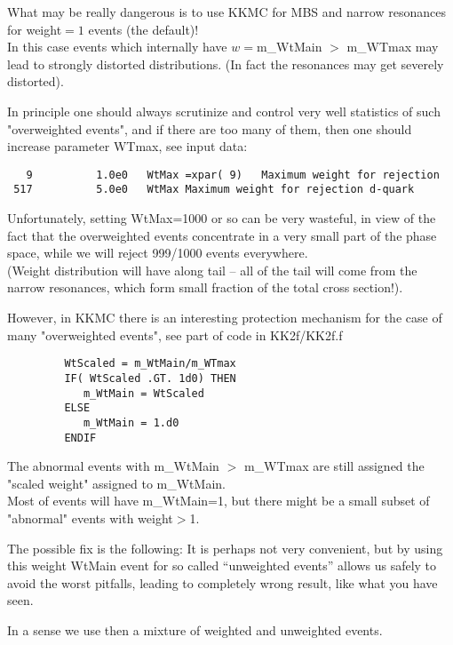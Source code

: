 \documentclass[dvips]{seminar}                      %
\begin{document}
\begin{slide}

What may be really dangerous is to use KKMC for MBS and narrow resonances
for  weight$=1$ events (the default)!\\
In this case events which internally have $w=$m\_WtMain $>$ m\_WTmax 
may lead to strongly distorted distributions.
(In fact the resonances may get severely distorted).

In principle one should always scrutinize and control very well statistics
of such "overweighted events", and if there are too many of them,
then one should increase parameter WTmax, see input data:
{\footnotesize
\begin{verbatim}
   9          1.0e0   WtMax =xpar( 9)   Maximum weight for rejection
 517          5.0e0   WtMax Maximum weight for rejection d-quark
\end{verbatim}}
Unfortunately, setting WtMax=1000 or so can be very wasteful, in view of the
fact that the overweighted events concentrate in a very small part of the phase space,
while we will reject 999/1000 events everywhere.\\
(Weight distribution will have  along tail -- all of the tail will 
come from the narrow resonances, which form small fraction of the total cross section!).
\vfill
\end{slide}    %

\begin{slide}

However, in KKMC there is an interesting
protection mechanism for the case of many "overweighted events",
see part of code in KK2f/KK2f.f
{\footnotesize
\begin{verbatim}
         WtScaled = m_WtMain/m_WTmax
         IF( WtScaled .GT. 1d0) THEN
            m_WtMain = WtScaled
         ELSE
            m_WtMain = 1.d0
         ENDIF
\end{verbatim}}
The abnormal events with m\_WtMain $>$ m\_WTmax are still assigned the "scaled weight" 
assigned to m\_WtMain.\\
Most of events will have m\_WtMain=1, but there might be a small subset of "abnormal"
events with weight$>$1.

The possible fix is the following:
It is perhaps not very convenient, but by using
this weight WtMain event for so called ``unweighted events''
allows us safely to avoid the worst pitfalls,
leading to completely wrong result, like what you have seen.

In a sense we use then a mixture of weighted and unweighted events.
\vfill
\end{slide}    %
\end{document}
